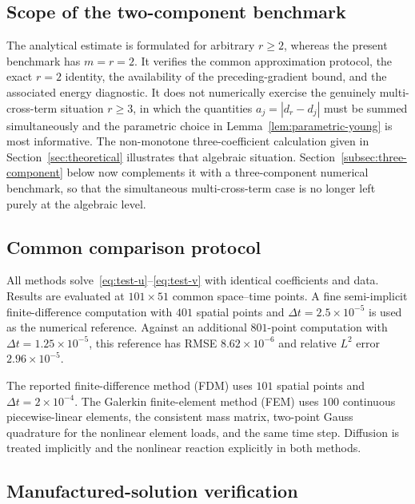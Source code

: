 \subsection{Scope of the two-component benchmark}

The analytical estimate is formulated for arbitrary $r\ge2$, whereas the present benchmark has $m=r=2$. It verifies the common approximation protocol, the exact $r=2$ identity, the availability of the preceding-gradient bound, and the associated energy diagnostic. It does not numerically exercise the genuinely multi-cross-term situation $r\ge3$, in which the quantities $a_j=|d_r-d_j|$ must be summed simultaneously and the parametric choice in Lemma~\ref{lem:parametric-young} is most informative. The non-monotone three-coefficient calculation given in Section~\ref{sec:theoretical} illustrates that algebraic situation. Section~\ref{subsec:three-component} below now complements it with a three-component numerical benchmark, so that the simultaneous multi-cross-term case is no longer left purely at the algebraic level.
\subsection{Common comparison protocol}

All methods solve~\eqref{eq:test-u}--\eqref{eq:test-v} with identical coefficients and data. Results are evaluated at $101\times51$ common space--time points. A fine semi-implicit finite-difference computation with $401$ spatial points and $\Delta t=2.5\times10^{-5}$ is used as the numerical reference. Against an additional $801$-point computation with $\Delta t=1.25\times10^{-5}$, this reference has RMSE $8.62\times10^{-6}$ and relative $L^2$ error $2.96\times10^{-5}$.

The reported finite-difference method (FDM) uses $101$ spatial points and $\Delta t=2\times10^{-4}$. The Galerkin finite-element method (FEM) uses $100$ continuous piecewise-linear elements, the consistent mass matrix, two-point Gauss quadrature for the nonlinear element loads, and the same time step. Diffusion is treated implicitly and the nonlinear reaction explicitly in both methods.


\subsection{Manufactured-solution verification}
\label{subsec:mms}


